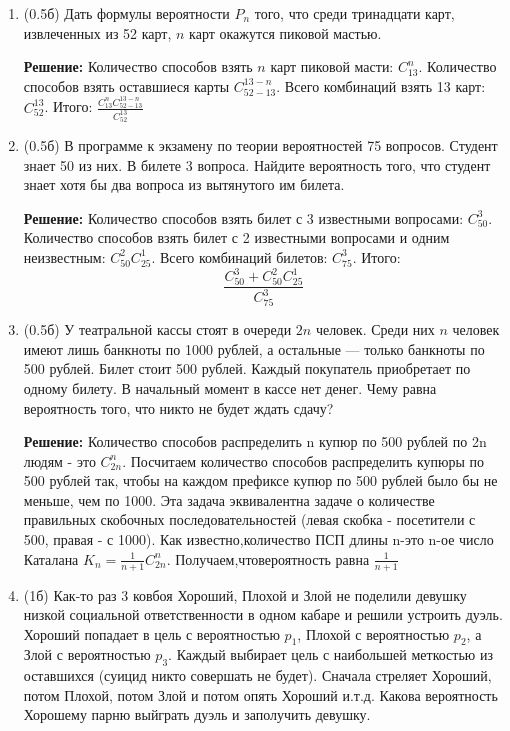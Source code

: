 \documentclass[a4paper, 14pt]{extarticle}
\begin{document}
\begin{enumerate}
\item (0.5б) Дать формулы вероятности $P_n$ того, что среди тринадцати карт, извлеченных из 52 карт, $n$ карт окажутся пиковой мастью.


\textbf{Решение:}
Количество способов взять $n$ карт пиковой масти: $C_{13}^n$. Количество способов взять оставшиеся карты $C_{52-13}^{13-n}$. Всего комбинаций взять 13 карт: $C_{52}^{13}$. Итого: $\frac{C_{13}^n C_{52-13}^{13-n}}{C_{52}^{13}}$

\item (0.5б) В программе к экзамену по теории вероятностей 75 вопросов. 
Студент знает 50 из них. В билете 3 вопроса. Найдите вероятность того, 
что студент знает хотя бы два вопроса из вытянутого им билета. 


\textbf{Решение:}
Количество способов взять билет с 3 известными вопросами: $C_{50}^3$. Количество способов взять билет с 2 известными вопросами и одним неизвестным: $C_{50}^2 C_{25}^1$. Всего комбинаций билетов: $C_{75}^3$. Итого: $$\frac{C_{50}^3 + C_{50}^2 C_{25}^1}{C_{75}^3}$$

\item (0.5б) У театральной кассы стоят в очереди $2n$ человек. Среди
	них $n$ человек имеют лишь банкноты по 1000 рублей, а остальные —
	только банкноты по 500 рублей. Билет стоит 500 рублей. Каждый покупатель
	приобретает по одному билету. В начальный момент в кассе нет денег.
	Чему равна вероятность того, что никто не будет ждать сдачу?

\textbf{Решение:}
Количество способов распределить n купюр по 500 рублей по 2n людям - это $C_{2n}^n$. Посчитаем количество способов распределить купюры по 500 рублей так, чтобы на каждом префиксе купюр по 500 рублей было бы не меньше, чем по 1000. Эта задача эквивалентна задаче о количестве правильных скобочных последовательностей (левая скобка - посетители с 500, правая - с 1000). Как известно,количество ПСП длины n-это n-ое число Каталана $K_n = \frac{1}{n+1}C_{2n}^n$. Получаем,чтовероятность равна $\frac{1}{n+1}$

\item (1б) Как-то раз 3 ковбоя Хороший, Плохой и Злой не поделили девушку низкой социальной ответственности в одном кабаре и решили устроить дуэль. Хороший попадает в цель с вероятностью $p_1$, Плохой с вероятностью $p_2$, а Злой с вероятностью $p_3$. Каждый выбирает цель с наибольшей меткостью из оставшихся (суицид никто совершать не будет). Сначала стреляет Хороший, потом Плохой, потом Злой и потом опять Хороший и.т.д. Какова вероятность Хорошему парню выйграть дуэль и заполучить девушку.



\end{enumerate}
\end{document}
